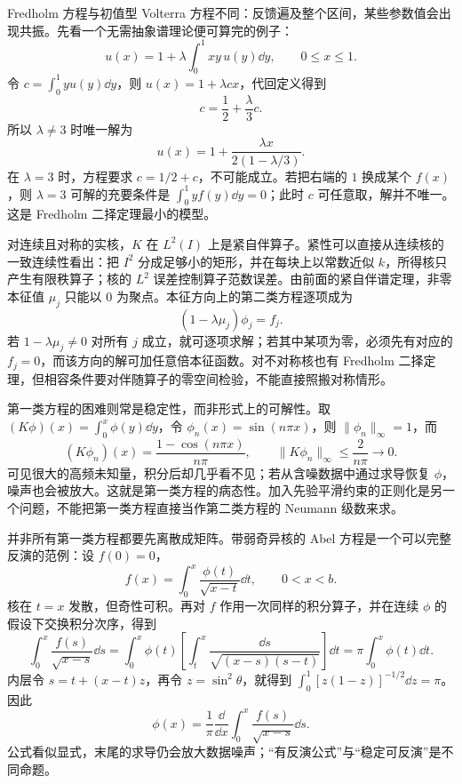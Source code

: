 Fredholm 方程与初值型 Volterra 方程不同：反馈遍及整个区间，某些参数值会出现共振。先看一个无需抽象谱理论便可算完的例子：
\begin{equation}
u(x)=1+\lambda\int_0^1 xy\,u(y)\dd y,\qquad 0\le x\le1.
\label{eq:advanced-rank-one-fredholm}
\end{equation}
令 $c=\int_0^1 y u(y)\dd y$，则 $u(x)=1+\lambda cx$，代回定义得到
\[
c=\frac12+\frac{\lambda}{3}c.
\]
所以 $\lambda\ne3$ 时唯一解为
\[
u(x)=1+\frac{\lambda x}{2(1-\lambda/3)}.
\]
在 $\lambda=3$ 时，方程要求 $c=1/2+c$，不可能成立。若把右端的 $1$ 换成某个 $f(x)$，则 $\lambda=3$ 可解的充要条件是 $\int_0^1 yf(y)\dd y=0$；此时 $c$ 可任意取，解并不唯一。这是 Fredholm 二择定理最小的模型。

对连续且对称的实核，$K$ 在 $L^2(I)$ 上是紧自伴算子。紧性可以直接从连续核的一致连续性看出：把 $I^2$ 分成足够小的矩形，并在每块上以常数近似 $k$，所得核只产生有限秩算子；核的 $L^2$ 误差控制算子范数误差。由前面的紧自伴谱定理，非零本征值 $\mu_j$ 只能以 $0$ 为聚点。本征方向上的第二类方程逐项成为
\begin{equation}
(1-\lambda\mu_j)\phi_j=f_j.
\label{eq:advanced-fredholm-spectral}
\end{equation}
若 $1-\lambda\mu_j\ne0$ 对所有 $j$ 成立，就可逐项求解；若其中某项为零，必须先有对应的 $f_j=0$，而该方向的解可加任意倍本征函数。对不对称核也有 Fredholm 二择定理，但相容条件要对伴随算子的零空间检验，不能直接照搬对称情形。

第一类方程的困难则常是稳定性，而非形式上的可解性。取 $(K\phi)(x)=\int_0^x\phi(y)\dd y$，令 $\phi_n(x)=\sin(n\pi x)$，则 $\|\phi_n\|_\infty=1$，而
\[
(K\phi_n)(x)=\frac{1-\cos(n\pi x)}{n\pi},\qquad
\|K\phi_n\|_\infty\le\frac{2}{n\pi}\longrightarrow0.
\]
可见很大的高频未知量，积分后却几乎看不见；若从含噪数据中通过求导恢复 $\phi$，噪声也会被放大。这就是第一类方程的病态性。加入先验平滑约束的正则化是另一个问题，不能把第一类方程直接当作第二类方程的 Neumann 级数来求。

并非所有第一类方程都要先离散成矩阵。带弱奇异核的 Abel 方程是一个可以完整反演的范例：设 $f(0)=0$，
\begin{equation}
f(x)=\int_0^x\frac{\phi(t)}{\sqrt{x-t}}\dd t,
\qquad 0<x<b.
\label{eq:advanced-abel-integral}
\end{equation}
核在 $t=x$ 发散，但奇性可积。再对 $f$ 作用一次同样的积分算子，并在连续 $\phi$ 的假设下交换积分次序，得到
\[
\int_0^x\frac{f(s)}{\sqrt{x-s}}\dd s
=\int_0^x\phi(t)\left[\int_t^x
\frac{\dd s}{\sqrt{(x-s)(s-t)}}\right]\dd t
=\pi\int_0^x\phi(t)\dd t.
\]
内层令 $s=t+(x-t)z$，再令 $z=\sin^2\theta$，就得到 $\int_0^1[z(1-z)]^{-1/2}\dd z=\pi$。因此
\begin{equation}
\phi(x)=\frac1\pi\frac{\dd}{\dd x}
\int_0^x\frac{f(s)}{\sqrt{x-s}}\dd s.
\label{eq:advanced-abel-inverse}
\end{equation}
公式看似显式，末尾的求导仍会放大数据噪声；“有反演公式”与“稳定可反演”是不同命题。

